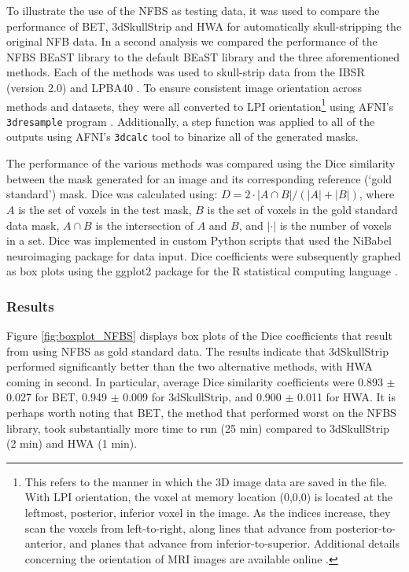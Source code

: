 To illustrate the use of the NFBS as testing data, it was used to compare the performance of BET, 3dSkullStrip and HWA for automatically skull-stripping the original NFB data. In a second analysis we compared the performance of the NFBS BEaST library to the default BEaST library and the three aforementioned methods. Each of the methods was used to skull-strip data from the IBSR (version 2.0) and LPBA40 \cite{IBSR, lpba40}. To ensure consistent image orientation across methods and datasets, they were all converted to LPI orientation\footnote{This refers to the manner in which the 3D image data are saved in the file. With LPI orientation, the voxel at memory location (0,0,0) is located at the leftmost, posterior, inferior voxel in the image. As the indices increase, they scan the voxels from left-to-right, along lines that advance from posterior-to-anterior, and planes that advance from inferior-to-superior.
Additional details concerning the orientation of MRI images are available online \cite{orientation}.} using AFNI's \texttt{3dresample} program \cite{afni}. Additionally, a step function was applied to all of the outputs using AFNI's \texttt{3dcalc} tool to binarize all of the generated masks.

\par The performance of the various methods was compared using the Dice similarity \cite{Dice1945} between the mask generated for an image and its corresponding reference (`gold standard') mask. Dice was calculated using: $D = 2 \cdot | A \cap B | / (|A| + |B|)$, where $A$ is the set of voxels in the test mask, $B$ is the set of voxels in the gold standard data mask, $A \cap B$ is the intersection of $A$ and $B$, and $|\cdot|$ is the number of voxels in a set. Dice was implemented in custom Python scripts that used the NiBabel neuroimaging package \cite{NiBabel} for data input. Dice coefficients were subsequently graphed as box plots using the ggplot2 package \cite{Wickham2009} for the R statistical computing language \cite{R}.


\subsubsection*{Results}
Figure \ref{fig:boxplot_NFBS} displays box plots of the Dice coefficients that result from using NFBS as gold standard data. The results indicate that 3dSkullStrip performed significantly better than the two alternative methods, with HWA coming in second. In particular, average Dice similarity coefficients were 0.893 $\pm$ 0.027 for BET, 0.949 $\pm$ 0.009 for 3dSkullStrip, and 0.900 $\pm$ 0.011 for HWA. It is perhaps worth noting that BET, the method that performed worst on the NFBS library, took substantially more time to run (25 min) compared to 3dSkullStrip (2 min) and HWA (1 min).

